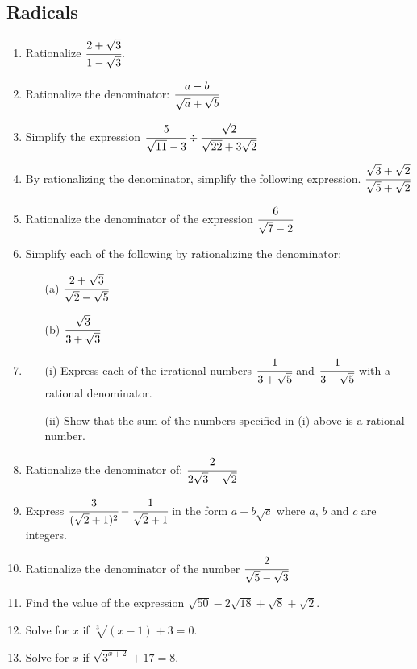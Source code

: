 	\subsection{Radicals}
\begin{enumerate}

	\item Rationalize $\cfrac{2 + \sqrt{3}}{1 - \sqrt{3}}$.

	\item Rationalize the denominator:
	$\cfrac{a - b}{\sqrt{a} + \sqrt{b}}$
	
	\item Simplify the expression
	$\cfrac{5}{\sqrt{11} - 3} \div \cfrac{\sqrt{2}}{\sqrt{22} + 3\sqrt{2}}$
	
	\item By rationalizing the denominator, simplify the following expression.
	$\cfrac{\sqrt{3} + \sqrt{2}}{\sqrt{5} + \sqrt{2}}$
	
	\item Rationalize the denominator of the expression
	$\cfrac{6}{\sqrt{7} - 2}$
	
	\item Simplify each of the following by rationalizing the denominator:
		\begin{itemize}
		\item[(a)] $\cfrac{2 + \sqrt{3}}{\sqrt{2} - \sqrt{5}}$
		\item[(b)] $\cfrac{\sqrt{3}}{3 + \sqrt{3}}$
		\end{itemize}
		
	\item 
		\begin{itemize}				
		\item[(i)] Express each of the irrational numbers $\cfrac{1}{3 + \sqrt{5}}$ and $\cfrac{1}{3 - \sqrt{5}}$ with a rational denominator.
		\item[(ii)] Show that the sum of the numbers specified in (i) above is a rational number.
		\end{itemize}

	\item Rationalize the denominator of: $\cfrac{2}{2\sqrt{3} + \sqrt{2}}$
	
	\item Express $\cfrac{3}{(\sqrt{2} + 1)^2} - \cfrac{1}{\sqrt{2} + 1}$ in the form $a + b\sqrt{c}$ where $a$, $b$ and $c$ are integers.
	
	\item Rationalize the denominator of the number $\cfrac{2}{\sqrt{5} - \sqrt{3}}$

	\item Find the value of the expression $\sqrt{50} - 2\sqrt{18} + \sqrt{8} + \sqrt{2}$.
	
	\item Solve for $x$ if $\sqrt[3]{(x - 1)} + 3 = 0$.
	
	\item Solve for $x$ if $\sqrt{3^{x + 2}} + 17 = 8$.

\end{enumerate}	
	
